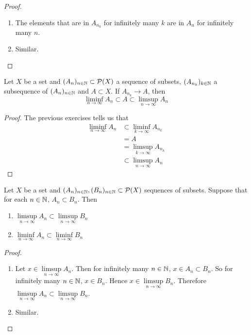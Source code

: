 \documentclass{book}
\begin{document}
	\begin{proof}\
		\begin{enumerate}
			\item The elements that are in $A_{n_k}$ for infinitely many $k$ are in $A_n$ for infinitely many $n$.
			\item Similar.
		\end{enumerate}
	\end{proof}
	
	\begin{ex}  
		Let $X$ be a set and $(A_n)_{n \in \mathbb{N}} \subset \mathcal{P}(X)$ a sequence of subsets, $(A_{n_k})_{k \in \mathbb{N}}$ a subsequence of $(A_n)_{n \in \mathbb{N}}$ and $A \subset X$. If $A_{n_k} \rightarrow A$, then $$\liminf\limits_{n \rightarrow \infty}A_n \subset A \subset \limsup\limits_{n \rightarrow \infty}A_n$$
	\end{ex}
	
	\begin{proof}
		The previous exercises tells us that 
		\begin{align*}
			\liminf\limits_{n \rightarrow \infty}A_n
			& \subset \liminf\limits_{k \rightarrow \infty}A_{n_k} \\
			&= A \\
			&= \limsup\limits_{k \rightarrow \infty}A_{n_k} \\
			& \subset \limsup\limits_{n \rightarrow \infty}A_n
		\end{align*}
	\end{proof}
	
	\begin{ex}  
		Let $X$ be a set and $(A_n)_{n \in \mathbb{N}}, (B_n)_{n \in \mathbb{N}} \subset \mathcal{P}(X)$ sequences of subsets. Suppose that for each $n \in \mathbb{N}$, $A_n \subset B_n$. Then 
		\begin{enumerate}
			\item $\limsup\limits_{n \rightarrow \infty}A_n \subset \limsup\limits_{n \rightarrow \infty}B_n$
			\item $\liminf\limits_{n \rightarrow \infty}A_n \subset \liminf\limits_{n \rightarrow \infty}B_n$
		\end{enumerate}
	\end{ex}
	
	\begin{proof}\
		\begin{enumerate}
			\item Let $x \in \limsup\limits_{n \rightarrow \infty}A_n$. Then for infinitely many $n \in \mathbb{N}$, $x \in A_n \subset B_n$. So for infinitely many $n \in \mathbb{N}$, $x \in B_n$. Hence $x \in \limsup\limits_{n \rightarrow \infty}B_n$. Therefore $\limsup\limits_{n \rightarrow \infty}A_n \subset \limsup\limits_{n \rightarrow \infty}B_n$.
			\item Similar.
		\end{enumerate}
	\end{proof}
	
\end{document}
